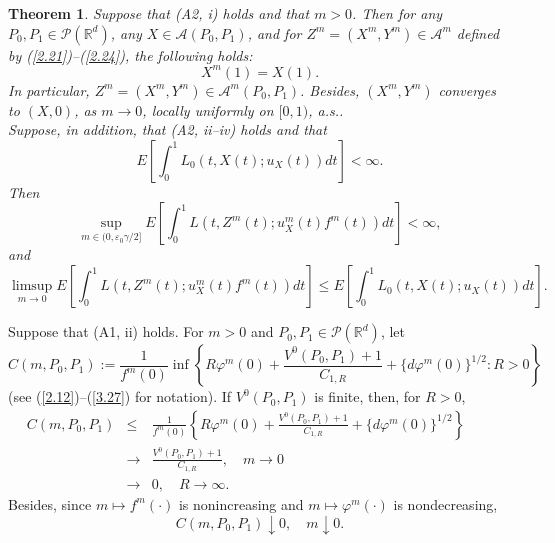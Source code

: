 \documentclass[12pt]{article}
\newtheorem{theorem}{Theorem}[section]
\begin{document}
\begin{theorem}\label{thm2.3}
Suppose that (A2, i) holds and that $m>0$.
Then  for any $P_0,P_1\in\mathcal{P}(\mathbb{R}^d)$, 
any $X\in\mathcal{A}(P_0,P_1)$, and for $Z^m=(X^m, Y^m)\in \mathcal{A}^{m}$ defined by (\ref{2.21})--(\ref{2.24}), the following holds:
\begin{equation}\label{2.29.00}
X^m(1)=X(1).
\end{equation}
In particular, $Z^m=(X^m, Y^m)\in \mathcal{A}^{m}(P_0,P_1)$.
Besides, %
$(X^m, Y^m)$ converges to $(X, 0)$, as $m\to 0$, locally uniformly on $[0,1)$, a.s..\\
Suppose, in addition, that (A2, ii--iv) holds and that
\begin{equation}
E\left[\int_0^1 L_0(t,X(t);u_X(t))dt\right]<\infty.
\end{equation}
Then 
\begin{equation}\label{2.29}
\sup_{m\in (0, \varepsilon_0\gamma/2]}E\left[\int_0^1 L(t,Z^m(t);u_X^m(t)f^m(t))dt\right]<\infty,
\end{equation}
and 
\begin{equation}\label{2.30}
\limsup_{m\to 0}E\left[\int_0^1 L(t,Z^m(t);u_X^m(t)f^m(t))dt\right]\le E\left[\int_0^1 L_0(t,X(t);u_X(t))dt\right].
\end{equation}
\end{theorem}


Suppose that (A1, ii) holds.
For $m>0$ and $P_0,P_1\in \mathcal{P}(\mathbb{R}^d )$, let
\begin{equation}\label{2.3300}
C(m,P_0,P_1):=\frac{1}{f^m(0)}\inf\left\{R\varphi^m(0)+\frac{V^0(P_0,P_1)+1}{C_{1,R}
}+\{d\varphi^m(0)\}^{1/2}:R>0\right\}
\end{equation}
(see (\ref{2.12})--(\ref{3.27}) for notation).
If $V^0(P_0,P_1)$ is finite, then,  for $R>0$,
\begin{eqnarray}
C(m,P_0,P_1)
&\le& \frac{1}{f^m(0)}\left\{R\varphi^m(0)+\frac{V^0(P_0,P_1)+1}{C_{1,R}}+\{d\varphi^m(0)\}^{1/2}\right\}\qquad\\
&\to &\frac{V^0(P_0,P_1)+1}{C_{1,R}}, \quad m\to 0\nonumber\\
&\to &0, \quad R\to\infty.\nonumber
\end{eqnarray}
Besides, since $m\mapsto f^m(\cdot)$ is nonincreasing and $m\mapsto \varphi^m (\cdot)$ is nondecreasing,
\begin{equation}
C(m,P_0,P_1)\downarrow 0, \quad m\downarrow 0.
\end{equation}
\end{document}

